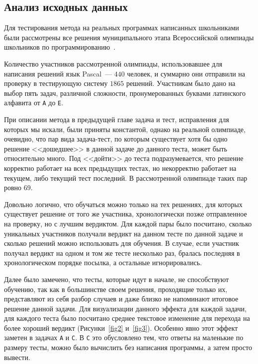 \subsection{Анализ исходных данных}

Для тестирования метода на реальных программах написанных школьниками были рассмотрены все решения муниципального
этапа Всероссийской олимпиады школьников по программированию~\cite{municipal}.

Количество участников рассмотренной олимпиады, использовавшее для написания решений язык Pascal~--- $440$ человек, и суммарно
они отправили на проверку в тестирующую систему $1865$ решений. Участникам было дано на выбор пять задач, различной сложности,
пронумерованных буквами латинского алфавита от \texttt{A} до \texttt{E}.

При описании метода в предыдущей главе задача и тест, исправления для которых мы искали, были приняты константой, однако
на реальной олимпиаде, очевидно, что пар вида задача-тест, по которым существует хотя бы одно решение <<дошедшее>> в данной задаче
до данного теста, может быть относительно много. Под <<дойти>> до теста подразумевается, что решение корректно работает на всех 
предыдущих тестах, но некорректно работает на текущем, либо текущий тест последний. В рассмотренной олимпиаде таких пар ровно
$69$.

Довольно логично, что обучаться можно только на тех решениях, для которых существует решение от того же участника, хронологически
позже отправленное на проверку, но с лучшим вердиктом.
Для каждой пары было посчитано, сколько уникальных участников получали вердикт на данном тесте по данной задаче и сколько решений 
можно использовать для обучения. В случае, если участник получал вердикт на одном и том же тесте несколько раз, бралась
последняя в хронологическом порядке посылка, а остальные игнорировались.

Далее было замечено, что тесты, которые идут в начале, не способствуют обучению, так как в большинстве своем решения, проходящие
только их, представляют из себя разбор случаев и даже близко не напоминают итоговое решение данной задачи. Для визуализации данного эффекта
для каждой задачи, для каждого теста было посчитано среднее текстовое изменение для перехода на более хороший вердикт 
(Рисунки~\ref{fig2} и~\ref{fig3}). Особенно явно этот эффект заметен в задачах \texttt{A} и \texttt{C}. В \texttt{C} это обусловлено
тем, что ответы на маленькие по размеру тесты, можно было вычислить без написания программы, а затем просто вывести.  
 
